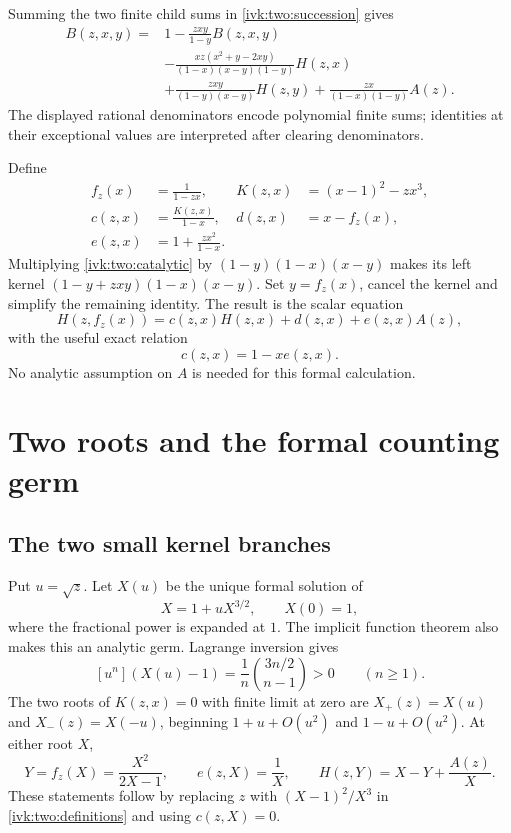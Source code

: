 \documentclass[11pt,letterpaper]{article}
\theoremstyle{remark}\newtheorem{remark}[theorem]{Remark}
\begin{document}
Summing the two finite child sums in \eqref{ivk:two:succession} gives
\begin{equation}\label{ivk:two:catalytic}
\begin{aligned}
 B(z,x,y)={}&1-\frac{zxy}{1-y}B(z,x,y)\\
 &-\frac{xz(x^2+y-2xy)}{(1-x)(x-y)(1-y)}H(z,x)\\
 &+\frac{zxy}{(1-y)(x-y)}H(z,y)
  +\frac{zx}{(1-x)(1-y)}A(z).
\end{aligned}
\end{equation}
The displayed rational denominators encode polynomial finite sums;
identities at their exceptional values are interpreted after clearing
denominators.

Define
\begin{equation}\label{ivk:two:definitions}
\begin{aligned}
 f_z(x)&=\frac1{1-zx},& K(z,x)&=(x-1)^2-zx^3,\\
 c(z,x)&=\frac{K(z,x)}{1-x},& d(z,x)&=x-f_z(x),\\
 e(z,x)&=1+\frac{zx^2}{1-x}.&&
\end{aligned}
\end{equation}
Multiplying \eqref{ivk:two:catalytic} by $(1-y)(1-x)(x-y)$ makes its left
kernel $(1-y+zxy)(1-x)(x-y)$. Set $y=f_z(x)$, cancel the kernel and
simplify the remaining identity. The result is the scalar equation
\begin{equation}\label{ivk:two:scalar}
 H(z,f_z(x))=c(z,x)H(z,x)+d(z,x)+e(z,x)A(z),
\end{equation}
with the useful exact relation
\begin{equation}\label{ivk:two:ce}
 c(z,x)=1-xe(z,x).
\end{equation}
No analytic assumption on $A$ is needed for this formal calculation.

\section{Two roots and the formal counting germ}
\subsection{The two small kernel branches}
Put $u=\sqrt z$. Let $X(u)$ be the unique formal solution of
\begin{equation}\label{ivk:two:Ximplicit}
 X=1+uX^{3/2},\qquad X(0)=1,
\end{equation}
where the fractional power is expanded at $1$. The implicit function
theorem also makes this an analytic germ. Lagrange inversion gives
\begin{equation}\label{ivk:two:lagrange}
 [u^n](X(u)-1)=\frac1n\binom{3n/2}{n-1}>0\qquad(n\ge1).
\end{equation}
The two roots of $K(z,x)=0$ with finite limit at zero are
$X_+(z)=X(u)$ and $X_-(z)=X(-u)$, beginning $1+u+O(u^2)$ and
$1-u+O(u^2)$. At either root $X$,
\begin{equation}\label{ivk:two:kernelinitial}
 Y=f_z(X)=\frac{X^2}{2X-1},\qquad
 e(z,X)=\frac1X,\qquad
 H(z,Y)=X-Y+\frac{A(z)}X.
\end{equation}
These statements follow by replacing $z$ with $(X-1)^2/X^3$ in
\eqref{ivk:two:definitions} and using $c(z,X)=0$.
\end{document}

